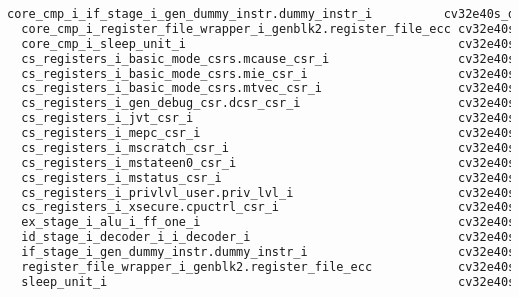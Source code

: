 \begin{lstlisting}[caption={Area report from synthesis of the CV32E40DC.}, label=lst:cv32e40dc_area, language=txt]
  core_cmp_i_if_stage_i_gen_dummy_instr.dummy_instr_i          cv32e40s_dummy_instr                                        56    126.882    59.469      186.351 
  core_cmp_i_register_file_wrapper_i_genblk2.register_file_ecc cv32e40s_register_file_ecc_REGFILE_NUM_READ_PORTS2         190    462.384   150.451      612.835 
  core_cmp_i_sleep_unit_i                                      cv32e40s_sleep_unit_LIB0                                     6     19.152     3.326       22.478 
  cs_registers_i_basic_mode_csrs.mcause_csr_i                  cv32e40s_csr_LIB0_WIDTH32_SHADOWCOPY1_RESETVALUE0_          29     43.776    39.057       82.833 
  cs_registers_i_basic_mode_csrs.mie_csr_i                     cv32e40s_csr_LIB0_WIDTH32_SHADOWCOPY1_RESETVALUE0_          44     69.084    60.059      129.143 
  cs_registers_i_basic_mode_csrs.mtvec_csr_i                   cv32e40s_csr_LIB0_WIDTH32_SHADOWCOPY1_RESETVALUE1_          62     96.102    84.367      180.469 
  cs_registers_i_gen_debug_csr.dcsr_csr_i                      cv32e40s_csr_LIB0_WIDTH32_SHADOWCOPY1_RESETVALUE10          24     35.568    33.868       69.436 
  cs_registers_i_jvt_csr_i                                     cv32e40s_csr_LIB0_WIDTH32_SHADOWCOPY1_RESETVALUE0_          62     96.102    84.367      180.469 
  cs_registers_i_mepc_csr_i                                    cv32e40s_csr_LIB0_WIDTH32_SHADOWCOPY1_RESETVALUE0_          72    113.886    98.736      212.622 
  cs_registers_i_mscratch_csr_i                                cv32e40s_csr_LIB0_WIDTH32_SHADOWCOPY1_RESETVALUE0_          75    116.964   102.062      219.026 
  cs_registers_i_mstateen0_csr_i                               cv32e40s_csr_LIB0_WIDTH32_SHADOWCOPY1_RESETVALUE0_           2      3.078     2.585        5.663 
  cs_registers_i_mstatus_csr_i                                 cv32e40s_csr_LIB0_WIDTH32_SHADOWCOPY1_RESETVALUE61          14     22.572    19.519       42.091 
  cs_registers_i_privlvl_user.priv_lvl_i                       cv32e40s_csr_LIB0_WIDTH2_SHADOWCOPY1_RESETVALUE3_M           5      7.524     6.272       13.796 
  cs_registers_i_xsecure.cpuctrl_csr_i                         cv32e40s_csr_LIB0_WIDTH32_SHADOWCOPY1_RESETVALUE25          21     32.832    28.376       61.208 
  ex_stage_i_alu_i_ff_one_i                                    cv32e40s_ff_one_6850                                        52     85.158    50.347      135.505 
  id_stage_i_decoder_i_i_decoder_i                             cv32e40s_i_decoder_CLIC0_3572                              167    252.054   158.433      410.487 
  if_stage_i_gen_dummy_instr.dummy_instr_i                     cv32e40s_dummy_instr_3569                                   56    126.882    59.469      186.351 
  register_file_wrapper_i_genblk2.register_file_ecc            cv32e40s_register_file_ecc_REGFILE_NUM_READ_PORTS2         190    462.384   150.451      612.835 
  sleep_unit_i                                                 cv32e40s_sleep_unit_LIB0_6852                                7     21.204     4.067       25.271 


\end{lstlisting}

